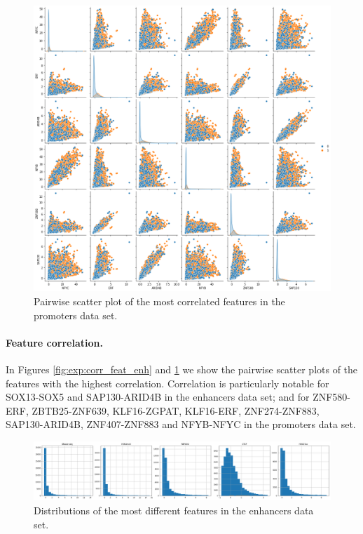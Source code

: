 \documentclass{article}
\begin{document}
\begin{figure}
    \centering
    \includegraphics[width=\textwidth]{img/most_correlated_features_promoters.png}
    \caption{Pairwise scatter plot of the most correlated features in the promoters data set.}
    \label{fig:exp:corr_feat_prom}
\end{figure}

\paragraph{Feature correlation.} In Figures \ref{fig:exp:corr_feat_enh} and \ref{fig:exp:corr_feat_prom} we show the pairwise scatter plots of the features with the highest correlation. Correlation is particularly notable for SOX13-SOX5 and SAP130-ARID4B in the enhancers data set; and for ZNF580-ERF, ZBTB25-ZNF639, KLF16-ZGPAT, KLF16-ERF, ZNF274-ZNF883, SAP130-ARID4B, ZNF407-ZNF883 and NFYB-NFYC in the promoters data set.

\begin{figure}
    \centering
    \includegraphics[width=\textwidth]{img/top_different_features_enhancers.png}
    \caption{Distributions of the most different features in the enhancers data set.}
    \label{fig:exp:distr_feat_enh}
\end{figure}
\end{document}
